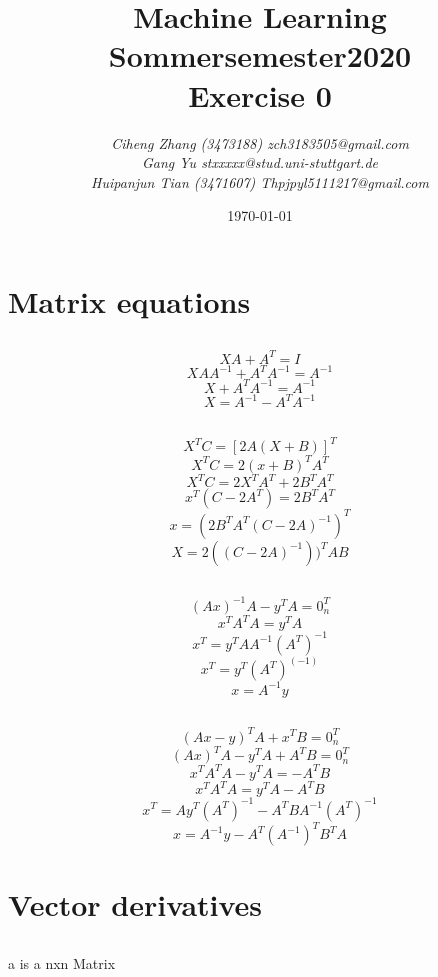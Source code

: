 \documentclass{article}
\begin{document}
\begin{titlepage}
    \title{\Huge \textbf{Machine Learning\\Sommersemester2020\\Exercise 0} }
    \author{\LARGE \textsl{Ciheng Zhang (3473188) zch3183505@gmail.com}\\\LARGE \textsl{Gang Yu stxxxxx@stud.uni-stuttgart.de}\\\LARGE \textsl{Huipanjun Tian (3471607)  Thpjpyl5111217@gmail.com} \\[200pt]}
    \date{\today}
    \maketitle
    \thispagestyle{empty}
\end{titlepage}
\newpage
\section{Matrix equations}
\subsection{ }
    \[XA+A^T=I\]
    \[XAA^{-1}+A^TA^{-1}=A^{-1}\]
    \[X+A^TA^{-1}=A^{-1}\]
    \[X=A^{-1}-A^TA^{-1}\] 
\subsection{ }
\[X^TC=[2A(X+B)]^T\]
\[X^TC=2(x+B)^TA^T\]
\[X^TC=2X^TA^T+2B^TA^T\]
\[x^T(C-2A^T)=2B^TA^T\]
\[x=(2B^TA^T(C-2A)^{-1})^T\]
\[X=2 ((C-2A)^{-1}))^TAB\]
\subsection{ }
\[(Ax)^{-1}A-y^TA=0_n^T\]
\[x^TA^TA=y^TA\]
\[x^T=y^TAA^{-1}(A^T)^{-1}\]
\[x^T=y^T(A^T)^(-1)\]
\[x=A^{-1}y\]
\subsection{ }
\[(Ax-y)^TA+x^TB=0_n^T\]
\[(Ax)^TA-y^TA+A^TB=0_n^T\]
\[x^TA^TA-y^TA=-A^TB\]
\[x^TA^TA=y^TA-A^TB\]
\[x^T=Ay^T(A^T)^{-1}-A^TBA^{-1}(A^T)^{-1}\]
\[x=A^{-1}y-A^T(A^{-1})^TB^TA\]
\section{Vector derivatives}
\subsection{ }
a is a nxn Matrix
\end{document}
